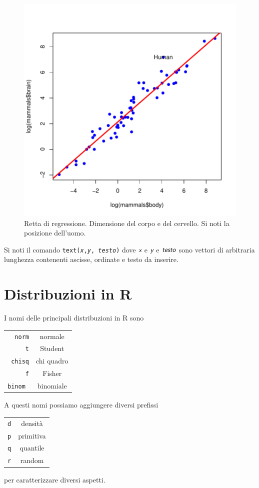 \documentclass[onecolumn,12pt]{book}
\newcommand{\varia}[1]{\textsl{\textsf{#1}}}
\begin{document}
\begin{figure}[htbp]
\begin{center}
\includegraphics{RbookParte2-054}
\caption{ Retta di regressione. Dimensione del corpo e del cervello. Si noti la posizione dell'uomo.}
\label{duerette}
\end{center}
\end{figure}
Si noti il comando \texttt{text(\varia{x},\varia{y}, \varia{testo})}
dove    $\varia{x}$ e $\varia{y}$  e $\varia{testo}$ sono vettori di arbitraria lunghezza contenenti ascisse, ordinate e testo da inserire.
\section{Distribuzioni in \textsf{R}}
I nomi delle principali distribuzioni in \textsf{R} sono\vskip10pt
\begin{tabular}{|r|c |}
\hline
\texttt{norm}&normale\\
\texttt{t}  &Student\\
\texttt{chisq}& chi quadro\\
\texttt{f}&Fisher\\
\texttt{binom }&binomiale\\
\hline
\end{tabular}\vskip10pt
A questi nomi possiamo aggiungere diversi prefissi\vskip10pt
\begin{tabular}{|r|c |}
\hline
\texttt{d}&densit\`a\\
\texttt{p}  &primitiva\\
\texttt{q}& quantile\\
\texttt{r}&random\\
  \hline
\end{tabular}
\vskip10pt
per caratterizzare diversi aspetti.
\end{document}
